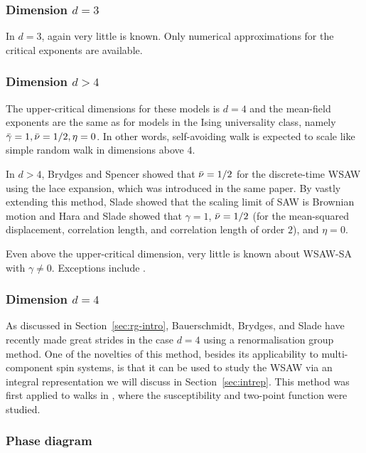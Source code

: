 \subsubsection{Dimension $d = 3$}

In $d = 3$, again very little is known. Only numerical approximations for
the critical exponents are available.

\subsubsection{Dimension $d > 4$}

The upper-critical dimensions for these models is $d = 4$ and the mean-field
exponents are the same as for models in the Ising universality class, namely
$\bar\gamma=1, \bar\nu = 1/2, \eta = 0$. In other words, self-avoiding walk
is expected to scale like simple random walk in dimensions above $4$.

In $d > 4$, Brydges and Spencer \cite{BS85} showed that $\bar\nu = 1/2$ for the
discrete-time WSAW using the lace expansion, which was introduced in the same paper.
By vastly extending this method, Slade \cite{Slad88} showed that the scaling limit
of SAW is Brownian motion and Hara and Slade \cite{HS92a,HS92b} showed that
$\gamma = 1$, $\bar\nu = 1/2$ (for the mean-squared displacement, correlation length,
and correlation length of order $2$), and $\eta = 0$.

Even above the upper-critical dimension, very little is known about WSAW-SA with
$\gamma \ne 0$. Exceptions include \cite{HH17,Uelt02}.

\subsubsection{Dimension $d = 4$}

As discussed in Section~\ref{sec:rg-intro}, Bauerschmidt, Brydges, and Slade have
recently made great strides in the case $d = 4$ using a renormalisation group method.
One of the novelties of this method, besides its applicability to multi-component
spin systems, is that it can be used to study the WSAW via an integral representation
we will discuss in Section~\ref{sec:intrep}. This method was first applied to walks
in \cite{BBS-saw4-log,BBS-saw4}, where the susceptibility and two-point function were
studied.

\subsubsection{Phase diagram}


